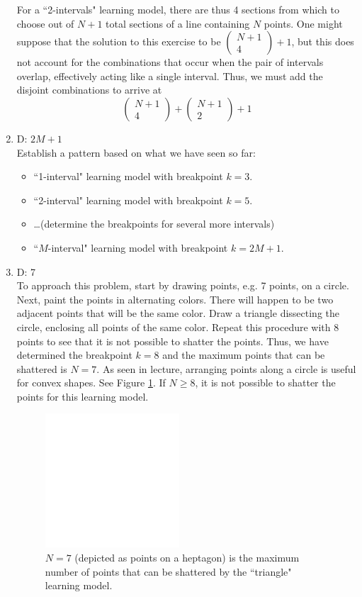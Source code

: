 \documentclass[11pt]{article}
\theoremstyle{definition}
\begin{document}
\begin{enumerate}
For a ``2-intervals" learning model, there are thus 4 sections from which to choose out of $N+1$ total sections of a line containing $N$ points. One might suppose that the solution to this exercise to be  \(\left( \begin{array}{c}N+1\\4 \end{array}\right)+1\), but this does not account for the combinations that occur when the pair of intervals overlap, effectively acting like a single interval. Thus, we must add the disjoint combinations to arrive at 
\[\left( 
\begin{array}{c} N+1\\ 4 \end{array}\right) + \left( \begin{array}{c} N+1\\ 2 \end{array}\right) + 1\]

\item D: $2M+1$\\
Establish a pattern based on what we have seen so far: 
	\begin{itemize}
	\item ``1-interval" learning model with breakpoint $k=3$.
	\item ``2-interval" learning model with breakpoint $k=5$.
	\item \dots (determine the breakpoints for several more intervals)
	\item ``$M$-interval" learning model with breakpoint $k=2M+1$.
	\end{itemize}

\item D: 7\\
To approach this problem, start by drawing points, e.g. 7 points, on a circle. Next, paint the points in alternating colors. There will happen to be two adjacent points that will be the same color. Draw a triangle dissecting the circle, enclosing all points of the same color. Repeat this procedure with 8 points to see that it is not possible to shatter the points. Thus, we have determined the breakpoint $k=8$ and the maximum points that can be shattered is $N=7$. As seen in lecture, arranging points along a circle is useful for convex shapes.
See Figure \ref{trianglemaxshatter}. If $N\geq8$, it is not possible to shatter the points for this learning model.
	\begin{figure}[ht!]
	\centering
	\includegraphics[width=50mm]{hw03q09.pdf}
	\caption{$N=7$ (depicted as points on a heptagon) is the maximum number of points that can be shattered by the ``triangle" learning model.}
	\label{trianglemaxshatter}
	\end{figure}
	

\end{enumerate}
\end{document}
